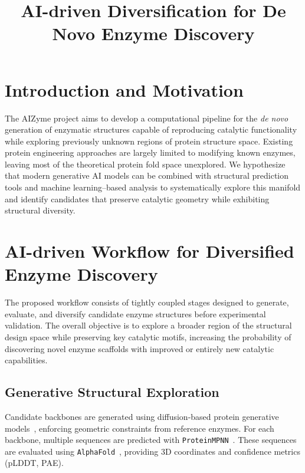 \documentclass[runningheads]{llncs}
\begin{document}
	
	\title{AI-driven Diversification for De Novo Enzyme Discovery}
	\author{}
	\institute{}
	\maketitle
	
	\section{Introduction and Motivation}
	
	The AIZyme project aims to develop a computational pipeline for the \emph{de novo} generation of enzymatic structures capable of reproducing catalytic functionality while exploring previously unknown regions of protein structure space. Existing protein engineering approaches are largely limited to modifying known enzymes, leaving most of the theoretical protein fold space unexplored. We hypothesize that modern generative AI models can be combined with structural prediction tools and machine learning–based analysis to systematically explore this manifold and identify candidates that preserve catalytic geometry while exhibiting structural diversity.
	
	\section{AI-driven Workflow for Diversified Enzyme Discovery}
	
	The proposed workflow consists of tightly coupled stages designed to generate, evaluate, and diversify candidate enzyme structures before experimental validation. The overall objective is to explore a broader region of the structural design space while preserving key catalytic motifs, increasing the probability of discovering novel enzyme scaffolds with improved or entirely new catalytic capabilities.
	
	\subsection{Generative Structural Exploration}
	
	Candidate backbones are generated using diffusion-based protein generative models~\cite{yim2024diffusion}, enforcing geometric constraints from reference enzymes. For each backbone, multiple sequences are predicted with \texttt{ProteinMPNN}~\cite{dauparas2022robust}. These sequences are evaluated using \texttt{AlphaFold}~\cite{jumper2020alphafold}, providing 3D coordinates and confidence metrics (pLDDT, PAE).
	
\end{document}

